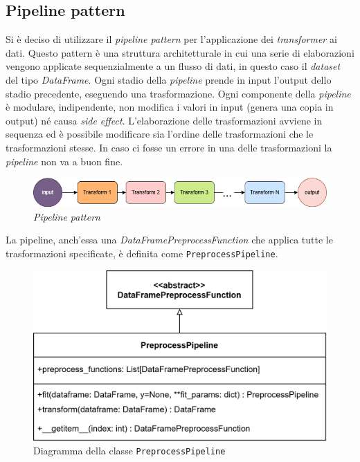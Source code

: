 \subsection{Pipeline pattern}

Si è deciso di utilizzare il \textit{pipeline pattern} per l'applicazione dei \textit{transformer} ai dati. Questo pattern è una struttura architetturale in cui una serie di elaborazioni vengono applicate sequenzialmente a un flusso di dati, in questo caso il \textit{dataset} del tipo \textit{DataFrame}. Ogni stadio della \textit{pipeline} prende in input l'output dello stadio precedente, eseguendo una trasformazione. Ogni componente della \textit{pipeline} è modulare, indipendente, non modifica i valori in input (genera una copia in output) né causa \textit{side effect}. L'elaborazione delle trasformazioni avviene in sequenza ed è possibile modificare sia l'ordine delle trasformazioni che le trasformazioni stesse. In caso ci fosse un errore in una delle trasformazioni la \textit{pipeline} non va a buon fine.

\begin{figure}[H]
    \centering
    \includegraphics[scale=0.45]{figures/pipeline.png}
    \caption{\textit{Pipeline pattern}}
    \label{fig:pipeline}
\end{figure}

La pipeline, anch'essa una \textit{DataFramePreprocessFunction} che applica tutte le trasformazioni specificate, è definita come \texttt{PreprocessPipeline}.

\begin{figure}[H]
    \centering
    \includegraphics[scale=0.2]{figures/UML/preprocessing/preprocess_pipeline.png}
    \caption{Diagramma della classe \texttt{PreprocessPipeline}}
    \label{fig:preprocess_pipeline}
\end{figure}

